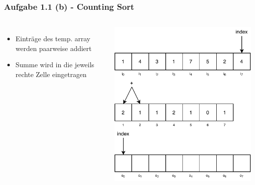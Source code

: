 \documentclass[aspectratio=169]{beamer}
\begin{document}
\begin{frame}
	\frametitle{Aufgabe 1.1 (b) - Counting Sort}
	\begin{columns}[c] %
	
	\begin{itemize}
		\item Einträge des temp. array werden paarweise addiert
		\item Summe wird in die jeweils rechte Zelle eingetragen
	\end{itemize}
	
	\includegraphics[scale=.7]{cs6.pdf}
	
	\end{columns}
	\end{frame}
\end{document}
